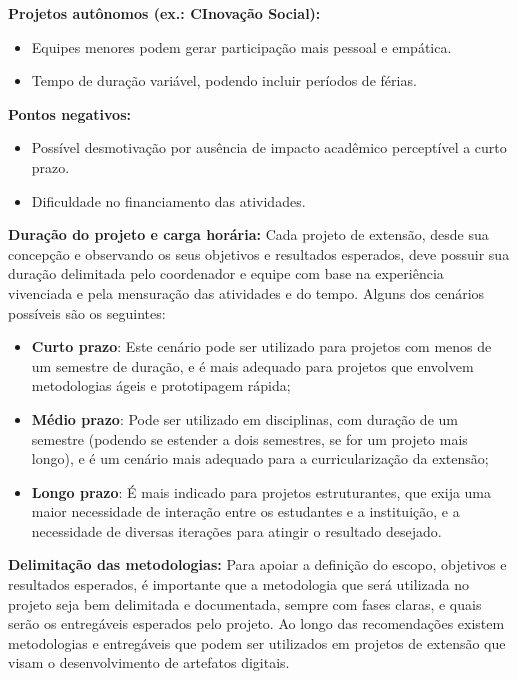 \textbf{Projetos autônomos (ex.: CInovação Social):}
\begin{itemize}
    \item Equipes menores podem gerar participação mais pessoal e empática.
    \item Tempo de duração variável, podendo incluir períodos de férias.
\end{itemize}

\textbf{Pontos negativos:}
\begin{itemize}
    \item Possível desmotivação por ausência de impacto acadêmico perceptível a curto prazo.
    \item Dificuldade no financiamento das atividades.
\end{itemize}

\textbf{Duração do projeto e carga horária:}
Cada projeto de extensão, desde sua concepção e observando os seus objetivos e resultados esperados, deve possuir sua duração delimitada pelo coordenador e equipe com base na experiência vivenciada e pela mensuração das atividades e do tempo. Alguns dos cenários possíveis são os seguintes:

\begin{itemize}
    \item \textbf{Curto prazo}: Este cenário pode ser utilizado para projetos com menos de um semestre de duração, e é mais adequado para projetos que envolvem metodologias ágeis e prototipagem rápida;
    \item \textbf{Médio prazo}: Pode ser utilizado em disciplinas, com duração de um semestre (podendo se estender a dois semestres, se for um projeto mais longo), e é um cenário mais adequado para a curricularização da extensão;
    \item \textbf{Longo prazo}: É mais indicado para projetos estruturantes, que exija uma maior necessidade de interação entre os estudantes e a instituição, e a necessidade de diversas iterações para atingir o resultado desejado.
\end{itemize}

\textbf{Delimitação das metodologias:}
Para apoiar a definição do escopo, objetivos e resultados esperados, é importante que a metodologia que será utilizada no projeto seja bem delimitada e documentada, sempre com fases claras, e quais serão os entregáveis esperados pelo projeto. Ao longo das recomendações existem metodologias e entregáveis que podem ser utilizados em projetos de extensão que visam o desenvolvimento de artefatos digitais. 

